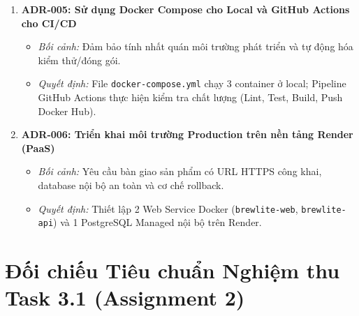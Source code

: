 \documentclass[11pt, a4paper]{article}
\begin{document}
\begin{enumerate}
\begin{itemize}
	      \end{itemize}
	\item \textbf{ADR-005: Sử dụng Docker Compose cho Local và GitHub Actions cho CI/CD}
	      \begin{itemize}
		      \item \textit{Bối cảnh:} Đảm bảo tính nhất quán môi trường phát triển và tự động hóa kiểm thử/đóng gói.
		      \item \textit{Quyết định:} File \texttt{docker-compose.yml} chạy 3 container ở local; Pipeline GitHub Actions thực hiện kiểm tra chất lượng (Lint, Test, Build, Push Docker Hub).
	      \end{itemize}
	\item \textbf{ADR-006: Triển khai môi trường Production trên nền tảng Render (PaaS)}
	      \begin{itemize}
		      \item \textit{Bối cảnh:} Yêu cầu bàn giao sản phẩm có URL HTTPS công khai, database nội bộ an toàn và cơ chế rollback.
		      \item \textit{Quyết định:} Thiết lập 2 Web Service Docker (\texttt{brewlite-web}, \texttt{brewlite-api}) và 1 PostgreSQL Managed nội bộ trên Render.
	      \end{itemize}
\end{enumerate}

\section{Đối chiếu Tiêu chuẩn Nghiệm thu Task 3.1 (Assignment 2)}
\end{document}
